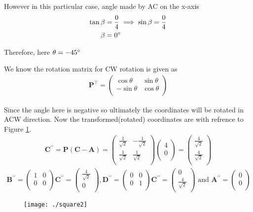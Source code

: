 \documentclass[12pt]{article}
\newcommand{\myvec}[1]{\ensuremath{\begin{pmatrix}#1\end{pmatrix}}}
\let\vec\mathbf
\begin{document}
However in this particular case, angle made by AC on the x-axis
\begin{align}
\tan\beta &= \frac{0}{4} \implies \sin\beta = \frac{0}{4}\\
\beta &= 0\degree
\end{align}

Therefore, here $\theta = -45\degree$

We know the rotation matrix for CW rotation is given as
\begin{align}
\vec{P}^\top =
\myvec{
\cos\theta & \sin\theta \\
-\sin\theta & \cos\theta \\
}
\end{align}

Since the angle here is negative so ultimately the coordinates will be rotated in ACW direction. Now the transformed(rotated) coordinates are with refrence to Figure \ref{fig:Fig3}.
\begin{align}
\vec{C^{\prime \prime}} = \vec{P}(\vec{C}-\vec{A}) =
\myvec{
\frac{1}{\sqrt{2}} & -\frac{1}{\sqrt{2}} \\
\frac{1}{\sqrt{2}} & \frac{1}{\sqrt{2}}\\
}
\myvec{
4 \\
0\\
} = 
\myvec{
\frac{4}{\sqrt{2}} \\
\frac{4}{\sqrt{2}}\\
}
\end{align}
\begin{align}
\vec{B^{\prime \prime}} = \myvec{
 1&0\\
 0&0\\
}\vec{C^{\prime \prime}}=
\myvec{
 \frac{4}{\sqrt{2}}\\
 0\\
},
\vec{D^{\prime \prime}} = \myvec{
 0&0\\
 0&1\\
}\vec{C^{\prime \prime}}=
\myvec{
 0\\
 \frac{4}{\sqrt{2}}\\
} \text{ and }
\vec{A^{\prime \prime}} =
\myvec{
0 \\
0\\
}
\end{align}

\begin{figure}[!h]
	\begin{center} 
	    \texttt{[image: ./square2]}
	\end{center}
\caption{}
\label{fig:Fig3}
\end{figure}
\end{document}
